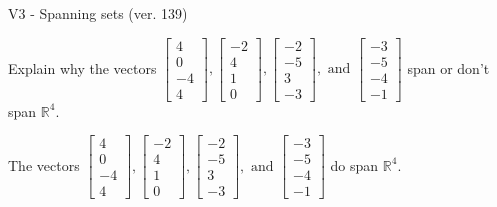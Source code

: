 \begin{exercise}
  \begin{exerciseTitle}V3 - Spanning sets (ver. 139)\end{exerciseTitle}
  \begin{exerciseStatement}
    Explain why the vectors \(\left[\begin{array}{r}
4 \\
0 \\
-4 \\
4
\end{array}\right] , \left[\begin{array}{r}
-2 \\
4 \\
1 \\
0
\end{array}\right] , \left[\begin{array}{r}
-2 \\
-5 \\
3 \\
-3
\end{array}\right] , \text{ and } \left[\begin{array}{r}
-3 \\
-5 \\
-4 \\
-1
\end{array}\right]\) span or don't span \(\mathbb{R}^4\). 
	


  \end{exerciseStatement}
  \begin{exerciseAnswer}
   The vectors \(\left[\begin{array}{r}
4 \\
0 \\
-4 \\
4
\end{array}\right] , \left[\begin{array}{r}
-2 \\
4 \\
1 \\
0
\end{array}\right] , \left[\begin{array}{r}
-2 \\
-5 \\
3 \\
-3
\end{array}\right] , \text{ and } \left[\begin{array}{r}
-3 \\
-5 \\
-4 \\
-1
\end{array}\right]\) 
  	 do  
	span \(\mathbb{R}^4\).
  


  \end{exerciseAnswer}
\end{exercise}